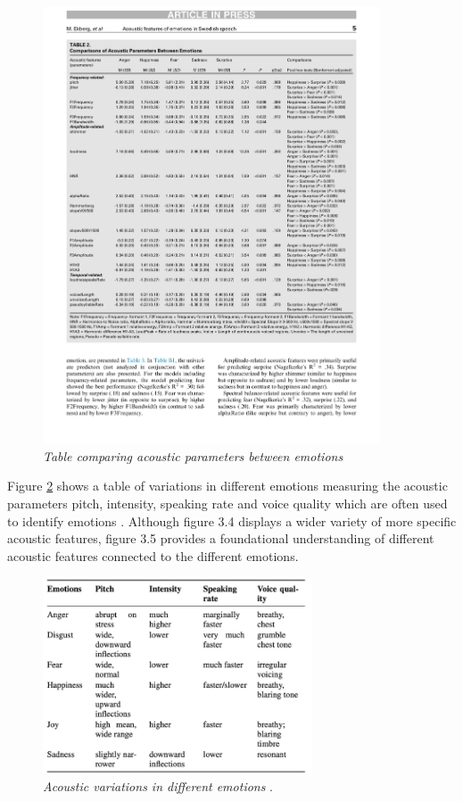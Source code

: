 \clearpage
\begin{figure}[ht]
    \centering
    \includegraphics[width=10cm]{png/theoretical/table-acoustic.pdf}
    \caption{\textit{Table comparing acoustic parameters between emotions} \autocite{Ekberg2023}}
    \label{fig:compare-acoustic-parameters}
\end{figure}

 Figure \ref{fig:acoustic-variations} shows a table of variations in different emotions measuring the acoustic parameters pitch, intensity, speaking rate and voice quality which are often used to identify emotions \autocite{Khalil2019}. Although figure 3.4 displays a wider variety of more specific acoustic features, figure 3.5 provides a foundational understanding of different acoustic features connected to the different emotions.

\begin{figure}[h]
    \centering
    \includegraphics[width=8cm]{png/Figure8-AcousticVariations.png}
    \caption{\textit{Acoustic variations in different emotions} \autocite{Khalil2019}.}
    \label{fig:acoustic-variations}
\end{figure}

